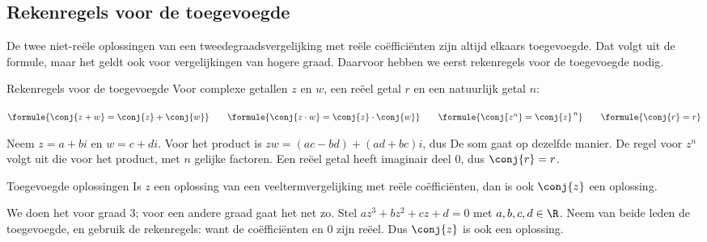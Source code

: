 \subsection{Rekenregels voor de toegevoegde}

De twee niet-reële oplossingen van een tweedegraadsvergelijking met reële coëfficiënten zijn altijd elkaars toegevoegde. Dat volgt uit de formule, maar het geldt ook voor vergelijkingen van hogere graad. Daarvoor hebben we eerst rekenregels voor de toegevoegde nodig.

\begin{theorie}
\begin{stelling}{Rekenregels voor de toegevoegde}
Voor complexe getallen $z$ en $w$, een reëel getal $r$ en een natuurlijk getal $n$:

\vspace{1mm}
\qquad $\formule{\conj{z + w} = \conj{z} + \conj{w}} \qquad \formule{\conj{z \cdot w} = \conj{z} \cdot \conj{w}} \qquad \formule{\conj{z^n} = \conj{z}^{\,n}} \qquad \formule{\conj{r} = r}$
\end{stelling}

\begin{bewijs}
Neem $z = a + bi$ en $w = c + di$. Voor het product is $zw = (ac - bd) + (ad + bc)i$, dus
De som gaat op dezelfde manier. De regel voor $z^n$ volgt uit die voor het product, met $n$ gelijke factoren. Een reëel getal heeft imaginair deel 0, dus $\conj{r} = r$.
\end{bewijs}

\begin{stelling}{Toegevoegde oplossingen}
Is $z$ een oplossing van een veeltermvergelijking met reële coëfficiënten, dan is ook $\conj{z}$ een oplossing.
\end{stelling}

\begin{bewijs}
We doen het voor graad 3; voor een andere graad gaat het net zo. Stel $az^3 + bz^2 + cz + d = 0$ met $a, b, c, d \in \R$. Neem van beide leden de toegevoegde, en gebruik de rekenregels:
want de coëfficiënten en 0 zijn reëel. Dus $\conj{z}$ is ook een oplossing.
\end{bewijs}
\end{theorie}

